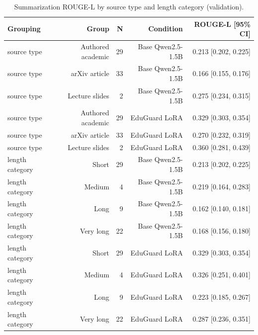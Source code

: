 \begin{table}[t]
\centering
\caption{Summarization ROUGE-L by source type and length category (validation).}
\label{tab:t5_summarization_breakdown}
\begin{tabular}{lrrrr}
\toprule
Grouping & Group & N & Condition & ROUGE-L [95\% CI] \\
\midrule
source type & Authored academic & 29 & Base Qwen2.5-1.5B & 0.213 [0.202, 0.225] \\
source type & arXiv article & 33 & Base Qwen2.5-1.5B & 0.166 [0.155, 0.176] \\
source type & Lecture slides & 2 & Base Qwen2.5-1.5B & 0.275 [0.234, 0.315] \\
source type & Authored academic & 29 & EduGuard LoRA & 0.329 [0.303, 0.354] \\
source type & arXiv article & 33 & EduGuard LoRA & 0.270 [0.232, 0.319] \\
source type & Lecture slides & 2 & EduGuard LoRA & 0.360 [0.281, 0.439] \\
length category & Short & 29 & Base Qwen2.5-1.5B & 0.213 [0.202, 0.225] \\
length category & Medium & 4 & Base Qwen2.5-1.5B & 0.219 [0.164, 0.283] \\
length category & Long & 9 & Base Qwen2.5-1.5B & 0.162 [0.140, 0.181] \\
length category & Very long & 22 & Base Qwen2.5-1.5B & 0.168 [0.156, 0.180] \\
length category & Short & 29 & EduGuard LoRA & 0.329 [0.303, 0.354] \\
length category & Medium & 4 & EduGuard LoRA & 0.326 [0.251, 0.401] \\
length category & Long & 9 & EduGuard LoRA & 0.223 [0.185, 0.267] \\
length category & Very long & 22 & EduGuard LoRA & 0.287 [0.236, 0.351] \\
\bottomrule
\end{tabular}
\end{table}

